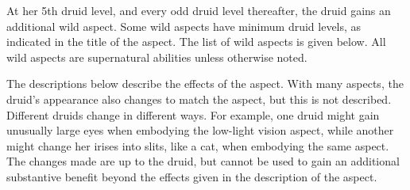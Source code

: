 At her 5th druid level, and every odd druid level thereafter, the druid gains an additional wild aspect.
Some wild aspects have minimum druid levels, as indicated in the title of the aspect.
The list of wild aspects is given below.
All wild aspects are supernatural abilities unless otherwise noted.

The descriptions below describe the effects of the aspect.
With many aspects, the druid's appearance also changes to match the aspect, but this is not described.
Different druids change in different ways.
For example, one druid might gain unusually large eyes when embodying the low-light vision aspect, while another might change her irises into slits, like a cat, when embodying the same aspect.
The changes made are up to the druid, but cannot be used to gain an additional substantive benefit beyond the effects given in the description of the aspect.

